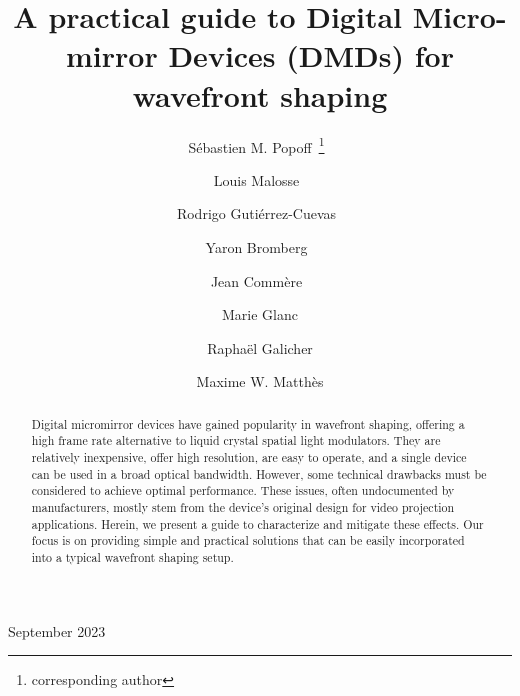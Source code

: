 \documentclass[12pt]{iopart}
\begin{document}
\title{A practical guide to Digital Micro-mirror Devices (DMDs) for wavefront shaping}

\author{Sébastien M. Popoff~\footnote{corresponding author}~}
\address{Institut Langevin, ESPCI Paris, PSL University, CNRS, France}

\author{Louis Malosse~}
\address{LIRA, Observatoire de Paris, Université PSL, CNRS, Université Paris Cité, Sorbonne Université, France}
\address{ISMO, University Paris Saclay, CNRS, France}

\author{Rodrigo Gutiérrez-Cuevas~}
\address{Institut Langevin, ESPCI Paris, PSL University, CNRS, France}

\author{Yaron Bromberg~}
\address{Racah Institute of Physics, The Hebrew University of Jerusalem, Israel}



\author{Jean Commère~}
\address{LIRA, Observatoire de Paris, Université PSL, CNRS, Université Paris Cité, Sorbonne Université, France}

\author{Marie Glanc}
\address{LIRA, Observatoire de Paris, Université PSL, CNRS, Université Paris Cité, Sorbonne Université, France}

\author{Raphaël Galicher}
\address{LIRA, Observatoire de Paris, Université PSL, CNRS, Université Paris Cité, Sorbonne Université, France}

\author{Maxime W. Matthès}
\address{Institut Langevin, ESPCI Paris, PSL University, CNRS, France}


\vspace{10pt}
\begin{indented}
  \item[]September 2023
\end{indented}

\begin{abstract}
  Digital micromirror devices have gained popularity in wavefront shaping,
  offering a high frame rate alternative to liquid crystal spatial light modulators.
  They are relatively inexpensive, offer high resolution,
  are easy to operate, and a single device can be used in a broad optical bandwidth.
  However, some technical drawbacks must be considered
  to achieve optimal performance.
  These issues, often undocumented by manufacturers,
  mostly stem from the device's original design for video projection applications.
  Herein, we present a guide to characterize and mitigate these effects.
  Our focus is on providing simple and practical solutions
  that can be easily incorporated into a typical wavefront shaping setup.
\end{abstract}
\end{document}
